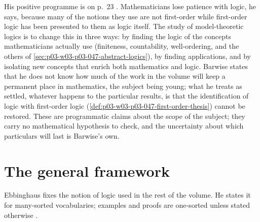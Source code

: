 His positive programme is on p.~23 \cite[Ch.~I, \S3, p.~23]{Barwise1985BackgroundAims}.
Mathematicians lose patience with logic, he says, because many of the notions
they use are not first-order while first-order logic has been presented to
them as logic itself.  The study of model-theoretic logics is to change this
in three ways: by finding the logic of the concepts mathematicians actually
use (finiteness, countability, well-ordering, and the others of
\cref{sec:p03-w03-p03-047-abstract-logics}), by finding applications, and by
isolating new concepts that enrich both mathematics and logic.  Barwise
states that he does not know how much of the work in the volume will keep a
permanent place in mathematics, the subject being young; what he treats as
settled, whatever happens to the particular results, is that the
identification of logic with first-order logic
(\cref{def:p03-w03-p03-047-first-order-thesis}) cannot be restored.  These
are programmatic claims about the scope of the subject; they carry no
mathematical hypothesis to check, and the uncertainty about which
particulars will last is Barwise's own.

\section{The general framework}
\label{sec:p03-w03-p03-047-ebbinghaus-framework}

Ebbinghaus fixes the notion of logic used in the rest of the volume.  He
states it for many-sorted vocabularies; examples and proofs are one-sorted
unless stated otherwise \cite[Ch.~II, introduction, p.~25]{Ebbinghaus1985ExtendedLogics}.

